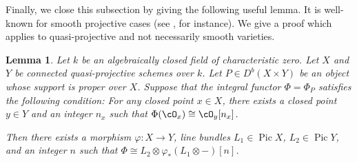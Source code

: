 \documentclass{amsart}
\numberwithin{equation}{section}
\theoremstyle{plain}
\newtheorem{lemma}[theorem]{Lemma}
\theoremstyle{definition}
\DeclareMathOperator{\Pic}{\mathrm{Pic}}
\begin{document}
Finally, we close this subsection by giving the following useful lemma.
It is well-known for smooth projective cases (see {\cite[3.3]{MR3713877}}, for instance).
We give a proof which applies to quasi-projective and not necessarily smooth varieties.

\begin{lemma}\label{lem:criterion-to-be-standard-functor}
    Let $k$ be an algebraically closed field of characteristic zero.
    Let $X$ and $Y$ be connected quasi-projective schemes over $k$.
    Let $P \in D^b(X \times Y)$ be an object whose support is proper over $X$.
    Suppose that the integral functor $\Phi = \Phi_P$ satisfies the following condition: For any closed point $x \in X$, there exists a closed point $y \in Y$ and an integer $n_x$ such that $\Phi(\cO_x) \cong \cO_y[n_x]$.

    Then there exists a morphism $\varphi \colon X \to Y$, line bundles $L_1 \in \Pic X$, $L_2 \in \Pic Y$, and an integer $n$ such that $\Phi \cong L_2 \otimes \varphi_*(L_1 \otimes -)[n]$.
\end{lemma}
\end{document}
